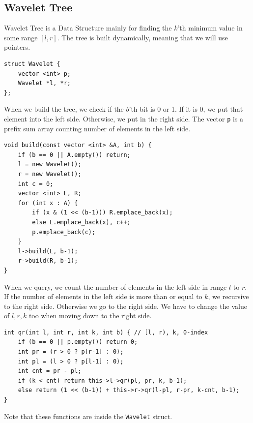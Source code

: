 \subsection{Wavelet Tree}

Wavelet Tree is a Data Structure mainly for finding the $k$'th minimum value in some range $[l, r]$. The tree is built dynamically, meaning that we will use pointers.

\begin{lstlisting}
struct Wavelet {
    vector <int> p;
    Wavelet *l, *r;
};
\end{lstlisting}

When we build the tree, we check if the $b$'th bit is 0 or 1. If it is 0, we put that element into the left side. Otherwise, we put in the right side. The vector \texttt{p} is a prefix sum array counting number of elements in the left side.

\begin{lstlisting}
void build(const vector <int> &A, int b) {
    if (b == 0 || A.empty()) return;
    l = new Wavelet();
    r = new Wavelet();
    int c = 0;
    vector <int> L, R;
    for (int x : A) {
        if (x & (1 << (b-1))) R.emplace_back(x);
        else L.emplace_back(x), c++;
        p.emplace_back(c);
    }
    l->build(L, b-1);
    r->build(R, b-1);
}
\end{lstlisting}

When we query, we count the number of elements in the left side in range $l$ to $r$. If the number of elements in the left side is more than or equal to $k$, we recursive to the right side. Otherwise we go to the right side. We have to change the value of $l, r, k$ too when moving down to the right side.

\begin{lstlisting}
int qr(int l, int r, int k, int b) { // [l, r), k, 0-index
    if (b == 0 || p.empty()) return 0;
    int pr = (r > 0 ? p[r-1] : 0);
    int pl = (l > 0 ? p[l-1] : 0);
    int cnt = pr - pl;
    if (k < cnt) return this->l->qr(pl, pr, k, b-1);
    else return (1 << (b-1)) + this->r->qr(l-pl, r-pr, k-cnt, b-1);
}
\end{lstlisting}

Note that these functions are inside the \texttt{Wavelet} struct.

\break